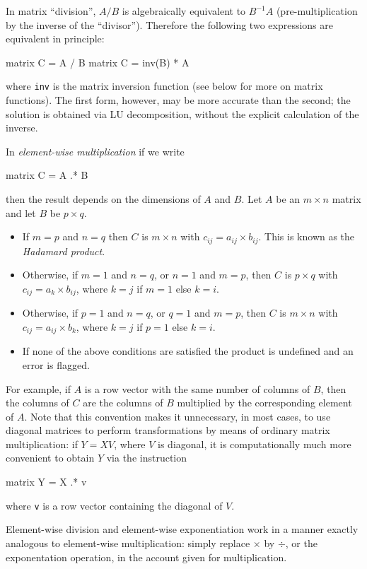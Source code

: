 In matrix ``division'', $A/B$ is algebraically equivalent to
$B^{-1}A$ (pre-multiplication by the inverse of the ``divisor'').
Therefore the following two expressions are equivalent in principle:
%
\begin{code}
matrix C = A / B
matrix C = inv(B) * A
\end{code}
%
where \texttt{inv} is the matrix inversion function (see below for
more on matrix functions).  The first form, however, may be more
accurate than the second; the solution is obtained via LU
decomposition, without the explicit calculation of the inverse.

In \textit{element-wise multiplication} if we write
%
\begin{code}
matrix C = A .* B
\end{code}
% 
then the result depends on the dimensions of $A$ and $B$.  Let $A$ be
an $m \times n$ matrix and let $B$ be $p \times q$.  
%
\begin{itemize}
\item If $m=p$ and $n=q$ then $C$ is $m\times n$ with $c_{ij} = a_{ij}
  \times b_{ij}$.  This is known as the \emph{Hadamard product}.
\item Otherwise, if $m=1$ and $n=q$, or $n=1$ and $m=p$, then $C$ is
  $p\times q$ with $c_{ij} = a_k \times b_{ij}$, where $k=j$ if $m=1$
  else $k=i$.
\item Otherwise, if $p=1$ and $n=q$, or $q=1$ and $m=p$, then $C$ is
  $m\times n$ with $c_{ij} = a_{ij} \times b_k$, where $k=j$ if $p=1$
  else $k=i$.
\item If none of the above conditions are satisfied the product is
  undefined and an error is flagged.
\end{itemize}
For example, if $A$ is a row vector with the same number of
columns of $B$, then the columns of $C$ are the columns of $B$
multiplied by the corresponding element of $A$.  Note that this
convention makes it unnecessary, in most cases, to use diagonal
matrices to perform transformations by means of ordinary matrix
multiplication: if $Y = XV$, where $V$ is diagonal, it is
computationally much more convenient to obtain $Y$ via the
instruction
%
\begin{code}
matrix Y = X .* v
\end{code}
%
where \texttt{v} is a row vector containing the diagonal of $V$.

Element-wise division and element-wise exponentiation work in a manner
exactly analogous to element-wise multiplication: simply replace
$\times$ by $\div$, or the exponentation operation, in the account
given for multiplication.


